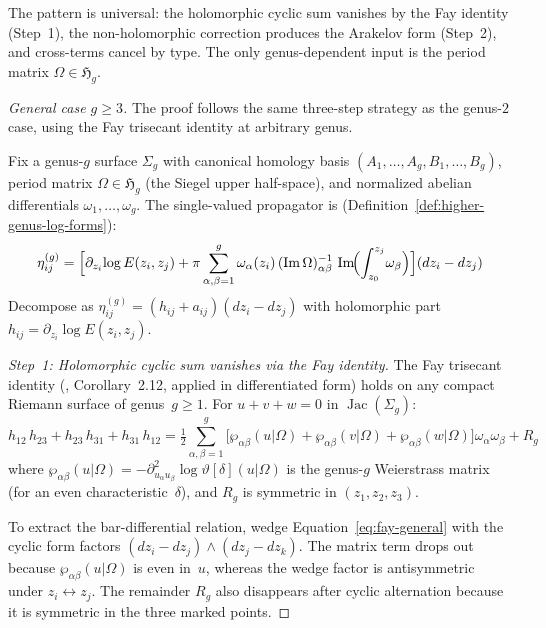 \begin{remark}\label{rem:genus2-summary}
The pattern is universal: the holomorphic cyclic sum vanishes by the Fay identity (Step~1), the non-holomorphic correction produces the Arakelov form (Step~2), and cross-terms cancel by type.  The only genus-dependent input is the period matrix $\Omega \in \mathfrak{H}_g$.
\end{remark}

\begin{proof}[General case $g \geq 3$]
The proof follows the same three-step strategy as the genus-$2$ case,
using the Fay trisecant identity at arbitrary genus.

Fix a genus-$g$ surface $\Sigma_g$ with canonical homology basis
$(A_1,\ldots,A_g, B_1,\ldots,B_g)$, period matrix
$\Omega \in \mathfrak{H}_g$ (the Siegel upper half-space),
and normalized abelian differentials $\omega_1,\ldots,\omega_g$.
The single-valued propagator is
(Definition~\ref{def:higher-genus-log-forms}):
\begin{equation}\label{eq:propagator-general-g}
\eta_{ij}^{(g)} = \Bigl[\partial_{z_i}\!\log E(z_i, z_j)
  + \pi \sum_{\alpha,\beta=1}^{g}
  \omega_\alpha(z_i)\,(\operatorname{Im}\Omega)^{-1}_{\alpha\beta}\,
  \operatorname{Im}\!\Bigl(\int_{z_0}^{z_j}\!\omega_\beta\Bigr)
\Bigr](dz_i - dz_j)
\end{equation}
Decompose as $\eta_{ij}^{(g)} = (h_{ij} + a_{ij})(dz_i - dz_j)$
with holomorphic part $h_{ij} = \partial_{z_i}\!\log E(z_i, z_j)$.

\emph{Step~1: Holomorphic cyclic sum vanishes via the Fay identity.}
The Fay trisecant identity (\cite{Fay73}, Corollary~2.12,
applied in differentiated form) holds on any compact Riemann
surface of genus~$g \geq 1$.  For $u + v + w = 0$ in
$\operatorname{Jac}(\Sigma_g)$:
\begin{equation}\label{eq:fay-general}
h_{12}\,h_{23} + h_{23}\,h_{31} + h_{31}\,h_{12}
= \tfrac{1}{2}\sum_{\alpha,\beta=1}^{g}
\bigl[\wp_{\alpha\beta}(u|\Omega) + \wp_{\alpha\beta}(v|\Omega)
  + \wp_{\alpha\beta}(w|\Omega)\bigr]
  \omega_\alpha \omega_\beta
  + R_g
\end{equation}
where $\wp_{\alpha\beta}(u|\Omega)
= -\partial^2_{u_\alpha u_\beta}\!\log\vartheta[\delta](u|\Omega)$
is the genus-$g$ Weierstrass matrix (for an even
characteristic~$\delta$), and $R_g$ is symmetric in
$(z_1, z_2, z_3)$.

To extract the bar-differential relation, wedge
Equation~\eqref{eq:fay-general} with the cyclic form factors
$(dz_i - dz_j) \wedge (dz_j - dz_k)$.  The matrix term drops out
because $\wp_{\alpha\beta}(u|\Omega)$ is even in~$u$, whereas the
wedge factor is antisymmetric under $z_i \leftrightarrow z_j$.
The remainder $R_g$ also disappears after cyclic alternation because
it is symmetric in the three marked points.


\end{proof}
